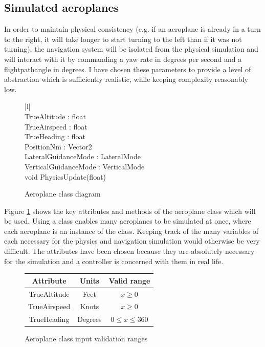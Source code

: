 \documentclass{article}
\begin{document}
\subsection{Simulated aeroplanes}
In order to maintain physical consistency (e.g. if an aeroplane is already in a turn to the right, it will take longer to start turning to the left than if it was not turning), the navigation system will be isolated from the physical simulation and will interact with it by commanding a yaw rate in degrees per second and a \gls{flightpathangle} in degrees.
I have chosen these parameters to provide a level of abstraction which is sufficiently realistic, while keeping complexity reasonably low.

\begin{figure}[H]
\centering
\begin{tabular}{ |l| } 
\hline
{} \\
\hline
TrueAltitude : float \\
TrueAirspeed : float \\
TrueHeading : float \\
PositionNm : Vector2 \\
LateralGuidanceMode : LateralMode \\
VerticalGuidanceMode : VerticalMode \\
\hline
void PhysicsUpdate(float) \\
\hline
\end{tabular}
\caption{\label{fig:aeroplaneclass}Aeroplane class diagram}
\end{figure}

Figure \ref{fig:aeroplaneclass} shows the key attributes and methods of the aeroplane class which will be used.
Using a class enables many aeroplanes to be simulated at once, where each aeroplane is an instance of the class.
Keeping track of the many variables of each necessary for the physics and navigation simulation would otherwise be very difficult.
The attributes have been chosen because they are absolutely necessary for the simulation and a controller is concerned with them in real life.

\begin{figure}[H]
\centering
\begin{tabular}{ |c|c|c| }
\hline
Attribute & Units & Valid range \\
\hline
TrueAltitude & Feet & $x \geq 0$ \\
\hline
TrueAirspeed & Knots & $x \geq 0$ \\
\hline
TrueHeading & Degrees & $0 \leq x \leq 360$ \\
\hline
\end{tabular}
\caption{\label{fig:aeroplaneclassinputs}Aeroplane class input validation ranges}
\end{figure}
\end{document}
